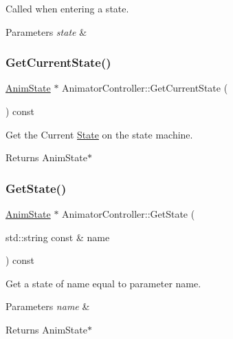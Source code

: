 Called when entering a state. 


\begin{DoxyParams}{Parameters}
{\em state} & \\
\hline
\end{DoxyParams}
\mbox{\label{classAnimatorController_ae84a0064dd344fb2a2b4bb6de69557e1}} 
\subsubsection{\texorpdfstring{Get\+Current\+State()}{GetCurrentState()}}
{\footnotesize\ttfamily \hyperlink{structAnimState}{Anim\+State} $\ast$ Animator\+Controller\+::\+Get\+Current\+State (\begin{DoxyParamCaption}{ }\end{DoxyParamCaption}) const}



Get the Current \hyperlink{classState}{State} on the state machine. 

\begin{DoxyReturn}{Returns}
Anim\+State$\ast$ 
\end{DoxyReturn}
\mbox{\label{classAnimatorController_aa2b6d02748cb880d596122448f685f9f}} 
\subsubsection{\texorpdfstring{Get\+State()}{GetState()}}
{\footnotesize\ttfamily \hyperlink{structAnimState}{Anim\+State} $\ast$ Animator\+Controller\+::\+Get\+State (\begin{DoxyParamCaption}\item[{std\+::string const \&}]{name }\end{DoxyParamCaption}) const}



Get a state of name equal to parameter name. 


\begin{DoxyParams}{Parameters}
{\em name} & \\
\hline
\end{DoxyParams}
\begin{DoxyReturn}{Returns}
Anim\+State$\ast$ 
\end{DoxyReturn}
\mbox{\label{classAnimatorController_ac079dc6e19c4284fa941033577ddd45d}} 
